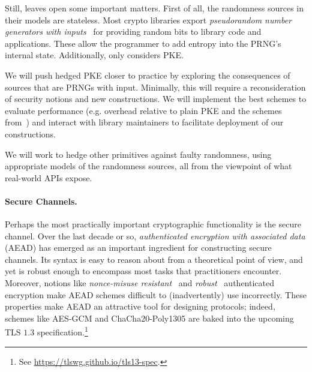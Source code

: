 Still, \cite{BPS} leaves open some important matters.  First of all, the
randomness sources in their models are stateless.  Most crypto libraries export
\emph{pseudorandom number generators with inputs}~\cite{BH05,DPR+13,ST15} for
providing random bits to library code and applications. These allow the
programmer to add entropy into the PRNG's internal state.  Additionally,
\cite{BPS} only considers PKE.


\begin{task}
We will push hedged PKE closer to practice by exploring the
consequences of sources that are PRNGs with input.  Minimally, this will require
a reconsideration of security notions and new constructions.  We will
implement the best schemes to evaluate performance (e.g. overhead
relative to plain PKE and the schemes from~\cite{BPS}) and interact
with library maintainers to facilitate deployment of our constructions.
\end{task}

\begin{task}
We will work to hedge other primitives against faulty randomness,
using appropriate models of the randomness sources, all from the
viewpoint of what real-world APIs expose.
\end{task}


\paragraph{Secure Channels. }
\fi
Perhaps the most practically important cryptographic functionality is the
secure channel.
%
%
Over the last decade or so, \emph{authenticated encryption with associated data}
(AEAD) has emerged as an important ingredient for constructing secure channels.
%
Its syntax is easy to reason about from a theoretical point of view, and yet is
robust enough to encompass most tasks that practitioners encounter. Moreover,
notions like \emph{nonce-misuse resistant}~\cite{RS06} and
\emph{robust}~\cite{HKR15} authenticated encryption make AEAD schemes difficult
to (inadvertently) use incorrectly. These properties make AEAD an attractive
tool for designing protocols; indeed, schemes like AES-GCM and
ChaCha20\mbox{-}Poly1305 are baked into the upcoming TLS $1.3$
specification.\footnote{ See \url{https://tlswg.github.io/tls13-spec}.}

